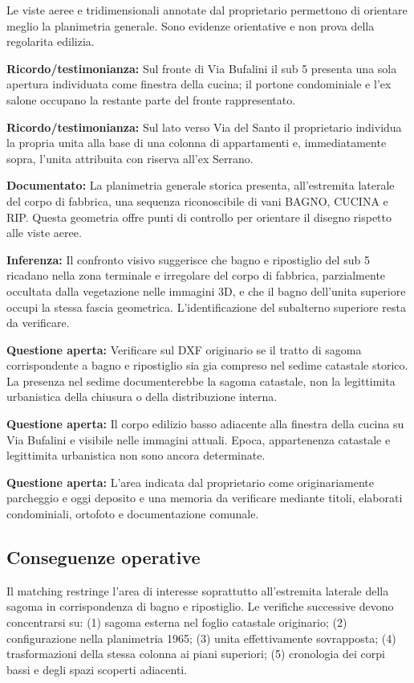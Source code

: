 \documentclass[11pt,a4paper]{article}
\newcommand{\docu}[1]{\textbf{\color{ok}Documentato:} #1}
\newcommand{\memo}[1]{\textbf{\color{accent}Ricordo/testimonianza:} #1}
\newcommand{\infer}[1]{\textbf{\color{warn}Inferenza:} #1}
\newcommand{\openq}[1]{\textbf{\color{warn}Questione aperta:} #1}
\begin{document}
Le viste aeree e tridimensionali annotate dal proprietario permettono di orientare meglio la planimetria generale. Sono evidenze orientative e non prova della regolarita edilizia.

\memo{Sul fronte di Via Bufalini il sub 5 presenta una sola apertura individuata come finestra della cucina; il portone condominiale e l'ex salone occupano la restante parte del fronte rappresentato.}

\memo{Sul lato verso Via del Santo il proprietario individua la propria unita alla base di una colonna di appartamenti e, immediatamente sopra, l'unita attribuita con riserva all'ex Serrano.}

\docu{La planimetria generale storica presenta, all'estremita laterale del corpo di fabbrica, una sequenza riconoscibile di vani BAGNO, CUCINA e RIP. Questa geometria offre punti di controllo per orientare il disegno rispetto alle viste aeree.}

\infer{Il confronto visivo suggerisce che bagno e ripostiglio del sub 5 ricadano nella zona terminale e irregolare del corpo di fabbrica, parzialmente occultata dalla vegetazione nelle immagini 3D, e che il bagno dell'unita superiore occupi la stessa fascia geometrica. L'identificazione del subalterno superiore resta da verificare.}

\openq{Verificare sul DXF originario se il tratto di sagoma corrispondente a bagno e ripostiglio sia gia compreso nel sedime catastale storico. La presenza nel sedime documenterebbe la sagoma catastale, non la legittimita urbanistica della chiusura o della distribuzione interna.}

\openq{Il corpo edilizio basso adiacente alla finestra della cucina su Via Bufalini e visibile nelle immagini attuali. Epoca, appartenenza catastale e legittimita urbanistica non sono ancora determinate.}

\openq{L'area indicata dal proprietario come originariamente parcheggio e oggi deposito e una memoria da verificare mediante titoli, elaborati condominiali, ortofoto e documentazione comunale.}

\subsection{Conseguenze operative}
Il matching restringe l'area di interesse soprattutto all'estremita laterale della sagoma in corrispondenza di bagno e ripostiglio. Le verifiche successive devono concentrarsi su: (1) sagoma esterna nel foglio catastale originario; (2) configurazione nella planimetria 1965; (3) unita effettivamente sovrapposta; (4) trasformazioni della stessa colonna ai piani superiori; (5) cronologia dei corpi bassi e degli spazi scoperti adiacenti.
\end{document}
